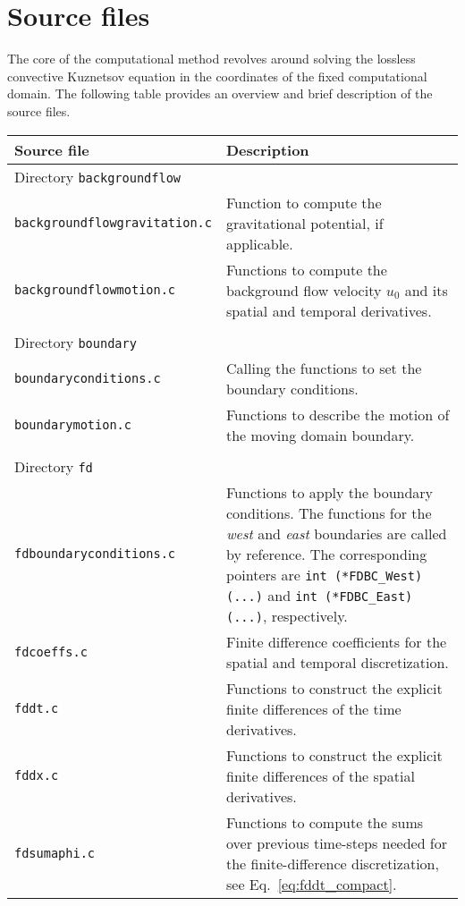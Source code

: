 \section{Source files}
\label{sec:Source files}

The core of the computational method revolves around solving the lossless convective Kuznetsov equation \citep{Schenke_et_al_2023_JASA} in the coordinates of the fixed computational domain. The following table provides an overview and brief description of the source files.

\noindent
\begin{longtable}{p{} p{}}
\textbf{Source file} & \textbf{Description}
\vspace{1mm} \\
\hline Directory {\tt backgroundflow} &\\ \hline
{\tt backgroundflowgravitation.c} & Function to compute the gravitational potential, if applicable.\\
{\tt backgroundflowmotion.c} & Functions to compute the background flow velocity $u_0$ and its spatial and temporal derivatives. \\
\\
\hline Directory {\tt boundary} &\\ \hline
{\tt boundaryconditions.c} & Calling the functions to set the boundary conditions. \\
{\tt boundarymotion.c} & Functions to describe the motion of the moving domain boundary. \\
\\
\hline Directory {\tt fd} &\\ \hline
{\tt fdboundaryconditions.c} & Functions to apply the boundary conditions. The functions for the \textit{west} and \textit{east} boundaries are called by reference. The corresponding pointers are {\tt int (*FDBC\_West)(...)} and {\tt int (*FDBC\_East)(...)}, respectively.  \\
{\tt fdcoeffs.c} & Finite difference coefficients for the spatial and temporal discretization. \\
{\tt fddt.c} & Functions to construct the explicit finite differences of the time derivatives. \\
{\tt fddx.c} & Functions to construct the explicit finite differences of the spatial derivatives.  \\
{\tt fdsumaphi.c} & Functions to compute the sums over previous time-steps needed for the finite-difference discretization, see Eq.~\eqref{eq:fddt_compact}. \\

\end{longtable}
